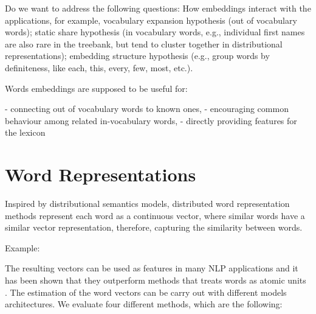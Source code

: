 \documentclass[11pt]{article}
\begin{document}



Do we want to address the following questions:
How embeddings interact with the applications, for example, vocabulary expansion hypothesis (out of vocabulary words); static share hypothesis (in vocabulary words, e.g., individual first names are also rare in the treebank, but tend to cluster together in distributional representations);
embedding structure hypothesis (e.g., group words by definiteness, like each, this, every, few, most, etc.).

Words embeddings are supposed to be useful for: 

- connecting out of vocabulary words to known ones, 
- encouraging common behaviour among related in-vocabulary words,
- directly providing features for the lexicon




\section{Word Representations}


Inspired by distributional semantics models, distributed word
representation methods represent each word as a continuous vector, where
similar words have a similar vector representation, therefore, capturing
the similarity between words.

Example: 

The resulting vectors can be used as features in many NLP applications and it has been shown that they outperform methods that treats words as atomic units \cite{}. 
The estimation of the word vectors can be carry out with different models architectures. 
We evaluate four different methods, which are the following: 
 
\end{document}
